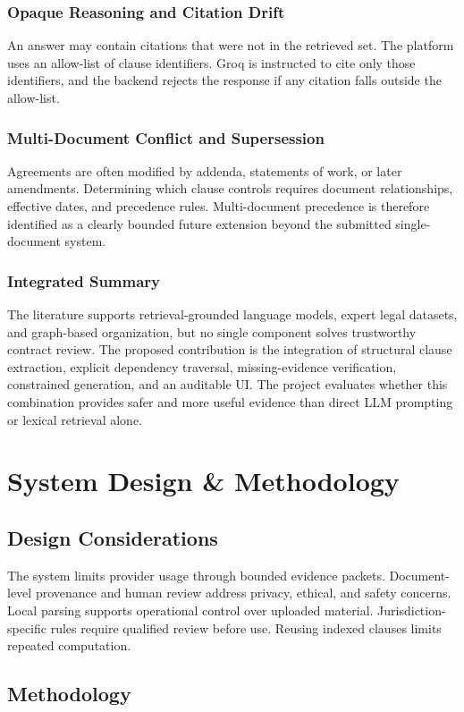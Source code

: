 \documentclass[12pt,a4paper,oneside]{report}
\begin{document}
\subsection{Opaque Reasoning and Citation Drift}
An answer may contain citations that were not in the retrieved set. The platform uses an allow-list of clause identifiers. Groq is instructed to cite only those identifiers, and the backend rejects the response if any citation falls outside the allow-list.

\subsection{Multi-Document Conflict and Supersession}
Agreements are often modified by addenda, statements of work, or later amendments. Determining which clause controls requires document relationships, effective dates, and precedence rules. Multi-document precedence is therefore identified as a clearly bounded future extension beyond the submitted single-document system.

\subsection{Integrated Summary}
The literature supports retrieval-grounded language models, expert legal datasets, and graph-based organization, but no single component solves trustworthy contract review. The proposed contribution is the integration of structural clause extraction, explicit dependency traversal, missing-evidence verification, constrained generation, and an auditable UI. The project evaluates whether this combination provides safer and more useful evidence than direct LLM prompting or lexical retrieval alone.

\chapter{System Design \& Methodology}
\section{Design Considerations}
The system limits provider usage through bounded evidence packets. Document-level provenance and human review address privacy, ethical, and safety concerns. Local parsing supports operational control over uploaded material. Jurisdiction-specific rules require qualified review before use. Reusing indexed clauses limits repeated computation.

\section{Methodology}
\end{document}
